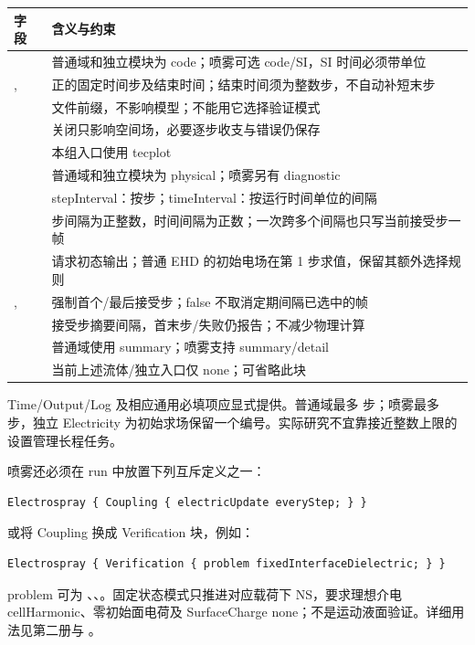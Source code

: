 \documentclass[a4paper,11pt]{article}
\begin{document}
\begin{longtable}{L{.29\linewidth}L{.63\linewidth}}
\toprule 字段 & 含义与约束 \\\midrule\endhead
{} & 普通域和独立模块为 code；喷雾可选 code/SI，SI 时间必须带单位 \\
,  & 正的固定时间步及结束时间；结束时间须为整数步，不自动补短末步 \\
 & 文件前缀，不影响模型；不能用它选择验证模式 \\
 & 关闭只影响空间场，必要逐步收支与错误仍保存 \\
 & 本组入口使用 tecplot \\
 & 普通域和独立模块为 physical；喷雾另有 diagnostic \\
 & stepInterval：按步；timeInterval：按运行时间单位的间隔 \\
 & 步间隔为正整数，时间间隔为正数；一次跨多个间隔也只写当前接受步一帧 \\
 & 请求初态输出；普通 EHD 的初始电场在第 1 步求值，保留其额外选择规则 \\
,  & 强制首个/最后接受步；false 不取消定期间隔已选中的帧 \\
 & 接受步摘要间隔，首末步/失败仍报告；不减少物理计算 \\
 & 普通域使用 summary；喷雾支持 summary/detail \\
 & 当前上述流体/独立入口仅 none；可省略此块 \\
\bottomrule
\end{longtable}
Time/Output/Log 及相应通用必填项应显式提供。普通域最多  步；喷雾最多  步，独立 Electricity 为初始求场保留一个编号。实际研究不宜靠接近整数上限的设置管理长程任务。

喷雾还必须在 run 中放置下列互斥定义之一：
\begin{lstlisting}
Electrospray { Coupling { electricUpdate everyStep; } }
\end{lstlisting}
或将 Coupling 换成 Verification 块，例如：
\begin{lstlisting}
Electrospray { Verification { problem fixedInterfaceDielectric; } }
\end{lstlisting}
problem 可为 、、。固定状态模式只推进对应载荷下 NS，要求理想介电 cellHarmonic、零初始面电荷及 SurfaceCharge none；不是运动液面验证。详细用法见第二册与 。
\end{document}
